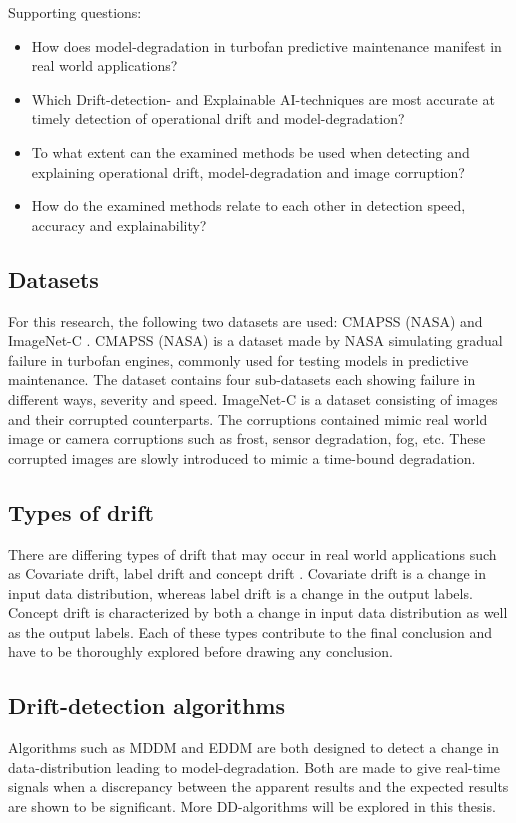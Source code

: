 Supporting questions:
\begin{itemize}
  \item How does model-degradation in turbofan predictive maintenance manifest in real world applications?
  \item Which Drift-detection- and Explainable AI-techniques are most accurate at timely detection of operational drift and model-degradation?
  \item To what extent can the examined methods be used when detecting and explaining operational drift, model-degradation and image corruption?
  \item How do the examined methods relate to each other in detection speed, accuracy and explainability?
\end{itemize}

\subsection{Datasets}
For this research, the following two datasets are used: CMAPSS (NASA) \autocite{Saxena2008} and ImageNet-C \autocite{Hendrycks2019}.
CMAPSS (NASA) is a dataset made by NASA simulating gradual failure in turbofan engines, commonly used for testing models in predictive maintenance.
The dataset contains four sub-datasets each showing failure in different ways, severity and speed.
ImageNet-C is a dataset consisting of images and their corrupted counterparts.
The corruptions contained mimic real world image or camera corruptions such as frost, sensor degradation, fog, etc.
These corrupted images are slowly introduced to mimic a time-bound degradation.

\subsection{Types of drift}
There are differing types of drift that may occur in real world applications such as Covariate drift, label drift and concept drift \autocite{Bayram2022}.
Covariate drift is a change in input data distribution, whereas label drift is a change in the output labels.
Concept drift is characterized by both a change in input data distribution as well as the output labels.
Each of these types contribute to the final conclusion and have to be thoroughly explored before drawing any conclusion.


\subsection{Drift-detection algorithms}
Algorithms such as MDDM \autocite{Pesaranghader2018} and EDDM \autocite{baena2006early} are both designed to detect a change in data-distribution leading to model-degradation. Both are made to give real-time signals when a discrepancy between the apparent results and the expected results are shown to be significant.
More DD-algorithms will be explored in this thesis.
